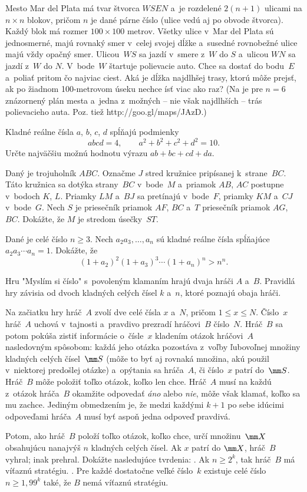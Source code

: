 {%
Mesto Mar del Plata má tvar štvorca $W\!SEN$ a~je rozdelené $2(n+1)$ ulicami na $n\times n$ blokov, pričom $n$ je dané párne číslo (ulice vedú aj po obvode štvorca). Každý blok má rozmer $100\times100$ metrov. Všetky ulice v~Mar del Plata sú jednosmerné, majú rovnaký smer v~celej svojej dĺžke a~susedné rovnobežné ulice majú vždy opačný smer. Ulicou~$WS$ sa jazdí v~smere z~$W$ do $S$ a~ulicou $WN$ sa jazdí z~$W$ do $N$. V~bode~$W$ štartuje polievacie auto. Chce sa dostať do bodu~$E$ a~poliať pritom čo najviac ciest. Aká je dĺžka najdlhšej trasy, ktorú môže prejsť, ak po žiadnom 100-metrovom úseku nechce ísť viac ako raz? (Na \obr{} je pre $n=6$ znázornený plán mesta a~jedna z~možných -- nie však najdlhších -- trás polievacieho auta. Poz. tiež http://goo.gl/maps/JAzD.)
%
}

{%
Kladné reálne čísla $a$, $b$, $c$, $d$ spĺňajú podmienky
$$
abcd=4,\qquad a^2+b^2+c^2+d^2 = 10.
$$
Určte najväčšiu možnú hodnotu výrazu $ab+bc+cd+da$.}

{%
Daný je trojuholník $ABC$. Označme $J$ stred kružnice pripísanej k~strane~$BC$. Táto kružnica sa dotýka strany~$BC$ v~bode~$M$ a~priamok $AB$, $AC$ postupne v~bodoch $K$, $L$. Priamky $LM$ a~$BJ$ sa pretínajú v~bode~$F$, priamky $KM$ a~$CJ$ v~bode~$G$. Nech $S$ je priesečník priamok $AF$, $BC$ a~$T$ priesečník priamok $AG$, $BC$. Dokážte, že $M$ je stredom úsečky~$ST$.}

{%
Dané je celé číslo $n\ge3$. Nech $a_2a_3, \dots,a_n$ sú kladné reálne čísla spĺňajúce $a_2a_3\cdots a_n=1$.
Dokážte, že
$$
(1+a_2)^2(1+a_3)^3\cdots(1+a_n)^n > n^n.
$$
}

{%
Hru "Myslím si číslo" s~povoleným klamaním hrajú dvaja hráči $A$ a~$B$. Pravidlá hry závisia od dvoch kladných celých čísel $k$ a~$n$, ktoré poznajú obaja hráči.

Na začiatku hry hráč~$A$ zvolí dve celé čísla $x$ a~$N$, pričom $1\le x\le N$. Číslo~$x$ hráč~$A$ uchová v~tajnosti a~pravdivo prezradí hráčovi~$B$ číslo~$N$. Hráč~$B$ sa potom pokúša zistiť informácie o~čísle~$x$ kladením otázok hráčovi~$A$ nasledovným spôsobom: každá jeho otázka pozostáva z~voľby ľubovoľnej množiny kladných celých čísel~$\mm S$ (môže to byť aj rovnaká množina, akú použil v~niektorej predošlej otázke) a~opýtania sa hráča~$A$, či číslo~$x$ patrí do~$\mm S$. Hráč~$B$ môže položiť toľko otázok, koľko len chce. Hráč~$A$ musí na každú z~otázok hráča~$B$ okamžite odpovedať {\it áno\/} alebo {\it nie}, môže však klamať, koľko sa mu zachce. Jediným obmedzením je, že medzi každými $k+1$ po sebe idúcimi odpoveďami hráča~$A$ musí byť aspoň jedna odpoveď pravdivá.

Potom, ako hráč~$B$ položí toľko otázok, koľko chce, určí množinu~$\mm X$ obsahujúcu nanajvýš $n$ kladných celých čísel.
Ak $x$ patrí do $\mm X$, hráč~$B$ vyhral; inak prehral. Dokážte nasledujúce tvrdenia:
.
Ak $n\ge 2^k$, tak hráč~$B$ má víťaznú stratégiu.
.
Pre každé dostatočne veľké číslo~$k$ existuje celé číslo $n\ge1{,}99^k$ také, že $B$ nemá víťaznú stratégiu.
\endgraf
}

